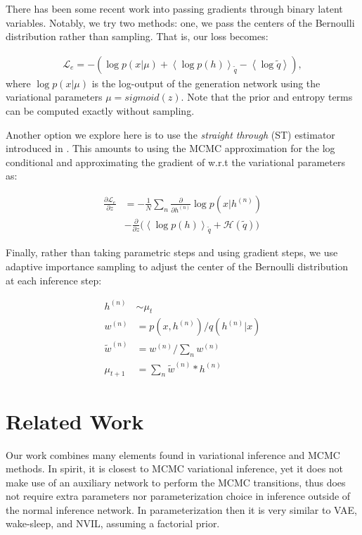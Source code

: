 \documentclass[preprint, twocolumn]{article}
\newcommand{\qexp}[1]{\left<#1\right>}
\newcommand{\LL}[0]{\mathcal{L}}
\newcommand{\HH}[0]{\mathcal{H}}
\begin{document}
There has been some recent work into passing gradients through binary latent variables. Notably, we try two methods: one, we pass the centers of the Bernoulli distribution rather than sampling. That is, our loss becomes:

\begin{align}
	 \LL_e = -(\log p(x | \mu) + \qexp{\log p(h)}_{\tilde{q}} - \qexp{\log \tilde{q}}),
\end{align}
where $\log p(x | \mu)$ is the log-output of the generation network using the variational parameters $\mu = sigmoid(z)$. Note that the prior and entropy terms can be computed exactly without sampling.

Another option we explore here is to use the \emph{straight through} (ST) \cite{bengio2013estimating} estimator introduced in \cite{Hinton-Coursera2012}. This amounts to using the MCMC approximation for the log conditional and approximating the gradient of w.r.t the variational parameters as:

\begin{align}
	\frac{\partial \LL_e}{\partial z} &=  -\frac{1}{N} \sum_n \frac{\partial}{\partial h^{(n)}} \log p(x|h^{(n)}) \nonumber \\
	&- \frac{\partial}{\partial z} \big( \qexp{\log p(h)}_{\tilde{q}} + \HH(\tilde{q}) \big) 
\end{align}

Finally, rather than taking parametric steps and using gradient steps, we use adaptive importance sampling to adjust the center of the Bernoulli distribution at each inference step:

\begin{align}
h^{(n)} &\sim \mu_t \nonumber \\
w^{(n)} &= p(x, h^{(n)}) / q(h^{(n)} | x) \nonumber \\
\tilde{w}^{(n)} &= w^{(n)} / \sum_n w^{(n)} \nonumber \\
\mu_{t+1} &= \sum_n \tilde{w}^{(n)} * h^{(n)}
\end{align}

\section{Related Work}
Our work combines many elements found in variational inference and MCMC methods. In spirit, it is closest to MCMC variational inference, yet it does not make use of an auxiliary network to perform the MCMC transitions, thus does not require extra parameters nor parameterization choice in inference outside of the normal inference network. In parameterization then it is very similar to VAE, wake-sleep, and NVIL, assuming a factorial prior.
\end{document}
